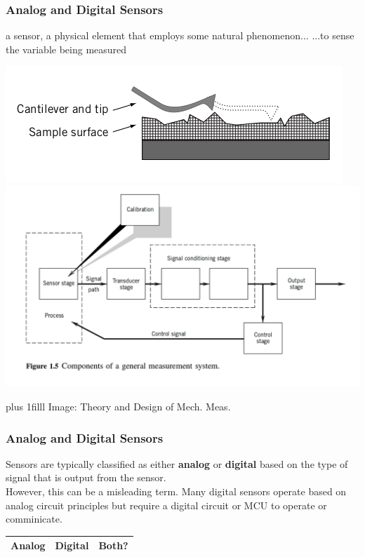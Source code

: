 \documentclass[fleqn]{beamer} %
\newcommand{\sectionIsubsectionItitle}{Analog and Digital Sensors}
\newcommand{\btVFill}{\vskip0pt plus 1filll}
\begin{document}
			\begin{frame}
				\frametitle{\sectionIsubsectionItitle}
				
				a {\PR sensor}, a physical element that employs some natural phenomenon... ...to sense the variable being measured
	
				\includegraphics[scale=0.30]{images/sensor_stage.png}\includegraphics[scale=0.20]{images/measurement_stages.png}

				\btVFill
				{\tiny Image: Theory and Design of Mech. Meas.}

			\end{frame}

			\begin{frame}
				\frametitle{\sectionIsubsectionItitle}

				Sensors are typically classified as either {\bf analog} or {\bf digital} based on the type of signal that is output from the sensor. \vspace{5mm} \\

				
				However, this can be a misleading term. Many digital sensors operate based on analog circuit principles but require a digital circuit or MCU to operate or comminicate. \vspace{5mm} \\

				\begin{tabular}{|c|c|c|} \hline
				 	Analog \hspace*{10mm}& Digital \hspace*{10mm}& Both? \hspace*{10mm} \\ \hline   
				\end{tabular}	


			\end{frame}
\end{document}
